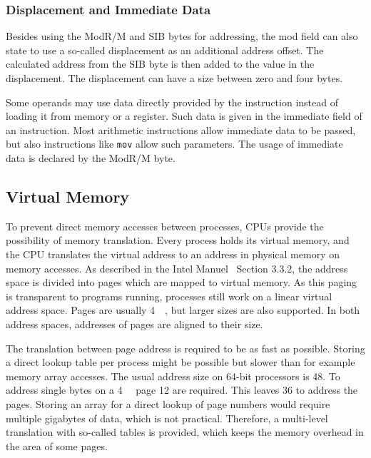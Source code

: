 \subsubsection{Displacement and Immediate Data}

Besides using the ModR/M and SIB bytes for addressing, the mod field can also
state to use a so-called displacement as an additional address offset. The
calculated address from the SIB byte is then added to the value in the
displacement. The displacement can have a size between zero and four bytes.

Some operands may use data directly provided by the instruction instead of
loading it from memory or a register. Such data is given in the immediate field
of an instruction. Most arithmetic instructions allow immediate data to be
passed, but also instructions like \texttt{mov} allow such parameters. The usage
of immediate data is declared by the ModR/M byte.

\subsection{Virtual Memory}

To prevent direct memory accesses between processes, CPUs provide the
possibility of memory translation. Every process holds its virtual memory, and
the CPU translates the virtual address to an address in physical memory on
memory accesses. As described in the Intel Manuel~\cite{intelsys} Section 3.3.2,
the address space is divided into pages which are mapped to virtual memory. As
this paging is transparent to programs running, processes still work on a linear
virtual address space. Pages are usually \SI{4}{\kilo\byte}, but larger sizes
are also supported. In both address spaces, addresses of pages are aligned to
their size.

The translation between page address is required to be as fast as possible.
Storing a direct lookup table per process might be possible but slower than for
example memory array accesses. The usual address size on 64-bit processors is
\SI{48}{\bit}. To address single bytes on a \SI{4}{\kilo\byte} page
\SI{12}{\bit} are required. This leaves \SI{36}{\bit} to address the pages.
Storing an array for a direct lookup of page numbers would require multiple
gigabytes of data, which is not practical. Therefore, a multi-level translation
with so-called tables is provided, which keeps the memory overhead in the area
of some pages.

